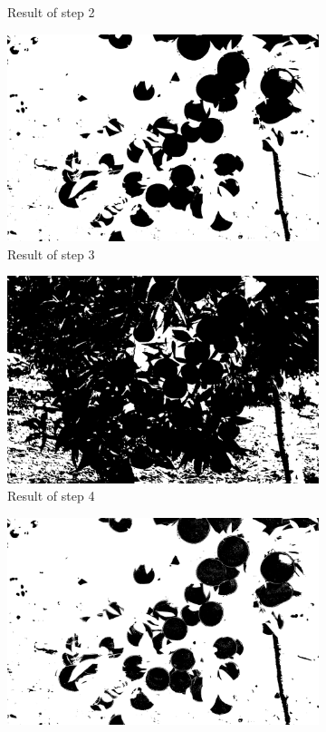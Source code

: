 \documentclass[conference]{IEEEtran}
\begin{document}
\begin{figure}[H]
\begin{subfigure}{.3\linewidth}
    \caption{Result of step 2}
  \end{subfigure}\par\medskip
  
  \begin{subfigure}{.3\linewidth}
    \includegraphics[width=\linewidth]{citrus1/citrus1_cr.jpg}\hfill
      \caption{Result of step 3}
  \end{subfigure}
  \begin{subfigure}{.3\linewidth}
    \includegraphics[width=\linewidth]{citrus1/citrus1_cb.jpg}\hfill
      \caption{Result of step 4}
  \end{subfigure}
  \begin{subfigure}{.3\linewidth}
    \includegraphics[width=\linewidth]{citrus1/citrus1_mask.jpg}

\end{subfigure}
\end{figure}
\end{document}
